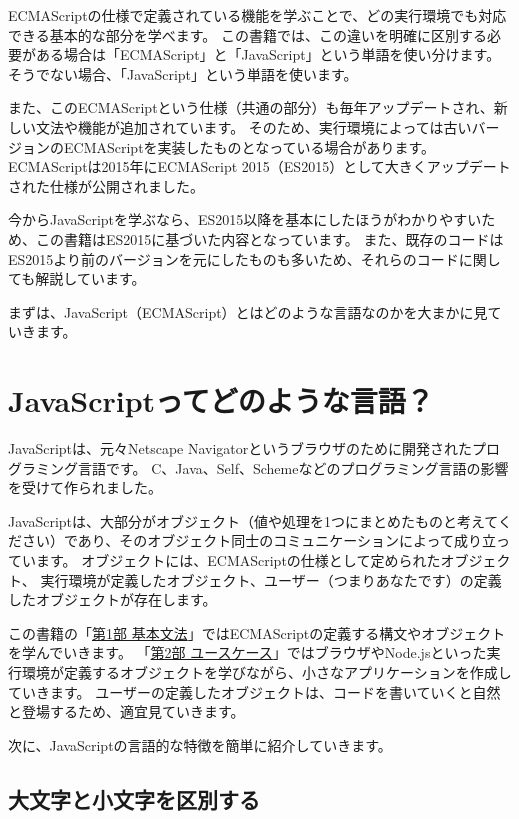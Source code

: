 ECMAScriptの仕様で定義されている機能を学ぶことで、どの実行環境でも対応できる基本的な部分を学べます。
この書籍では、この違いを明確に区別する必要がある場合は「ECMAScript」と「JavaScript」という単語を使い分けます。
そうでない場合、「JavaScript」という単語を使います。

また、このECMAScriptという仕様（共通の部分）も毎年アップデートされ、新しい文法や機能が追加されています。
そのため、実行環境によっては古いバージョンのECMAScriptを実装したものとなっている場合があります。
ECMAScriptは2015年にECMAScript
2015（ES2015）として大きくアップデートされた仕様が公開されました。

今からJavaScriptを学ぶなら、ES2015以降を基本にしたほうがわかりやすいため、この書籍はES2015に基づいた内容となっています。
また、既存のコードはES2015より前のバージョンを元にしたものも多いため、それらのコードに関しても解説しています。

まずは、JavaScript（ECMAScript）とはどのような言語なのかを大まかに見ていきます。

\hypertarget{about-javascript}{%
\section{JavaScriptってどのような言語？}\label{about-javascript}}

JavaScriptは、元々Netscape
Navigatorというブラウザのために開発されたプログラミング言語です。
C、Java、Self、Schemeなどのプログラミング言語の影響を受けて作られました。

JavaScriptは、大部分がオブジェクト（値や処理を1つにまとめたものと考えてください）であり、そのオブジェクト同士のコミュニケーションによって成り立っています。
オブジェクトには、ECMAScriptの仕様として定められたオブジェクト、
実行環境が定義したオブジェクト、ユーザー（つまりあなたです）の定義したオブジェクトが存在します。

この書籍の「\hyperlink{basic-grammar}{第1部 基本文法}」ではECMAScriptの定義する構文やオブジェクトを学んでいきます。
「\hyperlink{use-case}{第2部 ユースケース}」ではブラウザやNode.jsといった実行環境が定義するオブジェクトを学びながら、小さなアプリケーションを作成していきます。
ユーザーの定義したオブジェクトは、コードを書いていくと自然と登場するため、適宜見ていきます。

次に、JavaScriptの言語的な特徴を簡単に紹介していきます。

\hypertarget{case-sensitive}{%
\subsection{大文字と小文字を区別する}\label{case-sensitive}}


